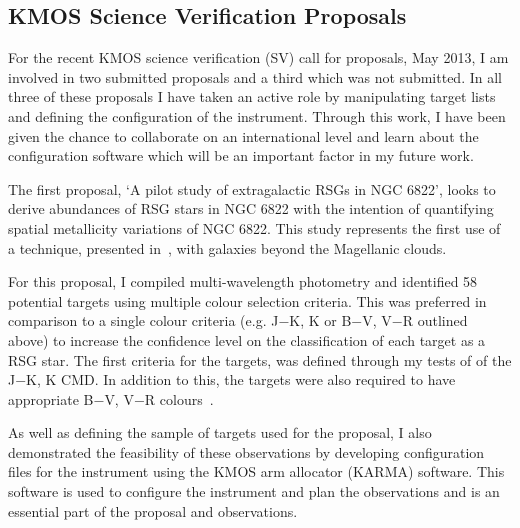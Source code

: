 \documentclass[a4paper,12pt]{article}
\begin{document}

\subsection{KMOS Science Verification Proposals}\label{KARMA}

For the recent KMOS science verification (SV) call for proposals, May 2013, I am involved in two submitted proposals and a third which was not submitted. 
In all three of these proposals I have taken an active role by manipulating target lists and defining the configuration of the instrument. 
Through this work, I have been given the chance to collaborate on an international level and learn about the configuration software which will be an important factor in my future work.

The first proposal, \textquoteleft A pilot study of extragalactic RSGs in NGC 6822\textquoteright, looks to derive abundances of RSG stars in NGC 6822 with the intention of quantifying spatial metallicity variations of NGC 6822. 
This study represents the first use of a technique, presented in~\cite{Davies10}, with galaxies beyond the Magellanic clouds. 

For this proposal, I compiled multi-wavelength photometry and identified 58 potential targets using multiple colour selection criteria.
This was preferred in comparison to a single colour criteria (e.g. J$-$K, K or B$-$V, V$-$R outlined above) to increase the confidence level on the classification of each target as a RSG star. 
The first criteria for the targets, was defined through my tests of of the J$-$K, K CMD. 
In addition to this, the targets were also required to have appropriate B$-$V, V$-$R colours~\citep[a criteria defined by][]{Massey98}.

As well as defining the sample of targets used for the proposal, I also demonstrated the feasibility of these observations by developing configuration files for the instrument using the KMOS arm allocator (KARMA) software. 
This software is used to configure the instrument and plan the observations and is an essential part of the proposal and observations. 
\end{document}
